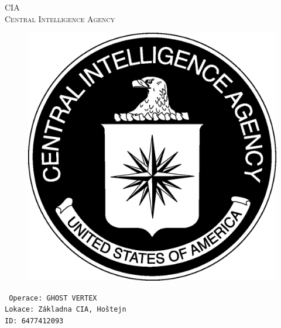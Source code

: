 \documentclass[a4paper, \fontheight]{article}
\begin{document}
	\begin{titlepage}
		\begin{center}		
			\textsc{{\fontsize{80}{0}\selectfont CIA}\\[2em]
				\Huge Central Intelligence Agency\\[2.5em]}
				
			\begin{figure}[H]
				\centering
				\includegraphics[scale=0.6]{sources/CIA_logo.eps}
			\end{figure}
		\end{center}	
		\vfill
		\noindent
		\texttt{\LARGE
				Operace: GHOST VERTEX\\[0.4em]
				Lokace: Základna CIA, Hoštejn\\[0.4em]
				ID: 6477412093}	
\end{titlepage} 
\end{document}
